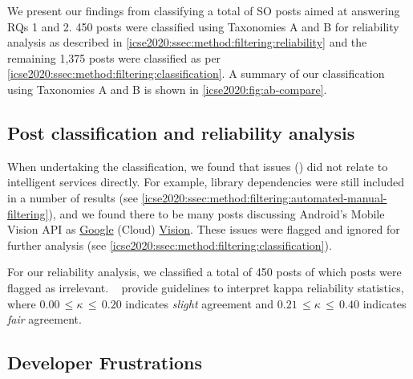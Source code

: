 We present our findings from classifying a total of \NumPostsCategorised{} SO posts aimed at answering RQs 1 and 2. 450 posts were classified using Taxonomies A and B for reliability analysis as described in \cref{icse2020:ssec:method:filtering:reliability} and the remaining 1,375 posts were classified as per \cref{icse2020:ssec:method:filtering:classification}. A summary of our classification using Taxonomies A and B is shown in \cref{icse2020:fig:ab-compare}.

\subsection{Post classification and reliability analysis}
When undertaking the classification, we found that \NumPostsNoise{} issues (\PctPostsNoise{}) did not relate to intelligent services directly. For example, library dependencies were still included in a number of results (see \cref{icse2020:ssec:method:filtering:automated-manual-filtering}), and we found there to be many posts  discussing Android's Mobile Vision API as \underline{Google} (Cloud) \underline{Vision}. These issues were flagged and ignored for further analysis (see \cref{icse2020:ssec:method:filtering:classification}).

For our reliability analysis, we classified a total of 450 posts of which \NumPostsFromFiftyNoise{} posts were flagged as irrelevant. 
~\citet{Landis:1977kv} provide guidelines to interpret kappa reliability statistics, where $0.00\,\leq \kappa\,\leq\,0.20$ indicates \textit{slight} agreement and $0.21\,\leq \kappa\,\leq\,0.40$ indicates \textit{fair} agreement. 

\subsection{Developer Frustrations}

